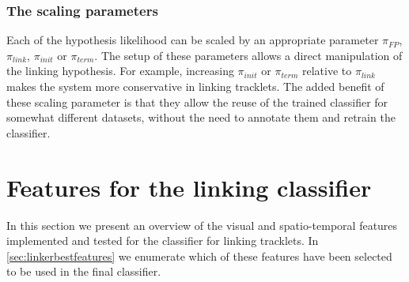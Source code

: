 		\subsubsection{The scaling parameters \statusfirstdraft}
		\label{sec:tracking_scalingparameters}
		Each of the hypothesis likelihood can be scaled by an appropriate parameter $\pi_{FP}$, $\pi_{link}$, $\pi_{init}$ or $\pi_{term}$. The setup of these parameters allows a direct manipulation of the linking hypothesis. For example, increasing $\pi_{init}$ or $\pi_{term}$ relative to $\pi_{link}$ makes the system more conservative in linking tracklets. The added benefit of these scaling parameter is that they allow the reuse of the trained classifier for somewhat different datasets, without the need to annotate them and retrain the classifier.
	
 	\section{Features for the linking classifier \statusoutline}
 		\label{sec:linkerclassifierfeatures}
 		
 		In this section we present an overview of the visual and spatio-temporal features implemented and tested for the classifier for linking tracklets. In \cref{sec:linkerbestfeatures} we enumerate which of these features have been selected to be used in the final classifier. 
 		
